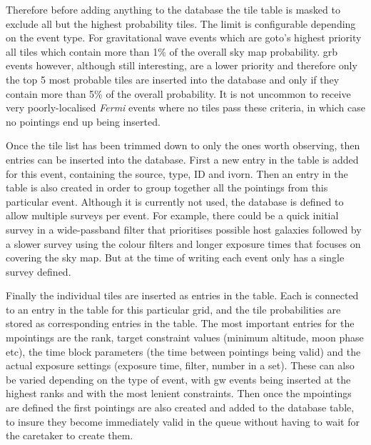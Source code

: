 \begin{colsection}
\begin{colsection}
\newpage











Therefore before adding anything to the database the tile table is masked to exclude all but the highest probability tiles. The limit is configurable depending on the event type. For gravitational wave events which are \gls{goto}'s highest priority all tiles which contain more than 1\% of the overall sky map probability. \gls{grb} events however, although still interesting, are a lower priority and therefore only the top 5 most probable tiles are inserted into the database and only if they contain more than 5\% of the overall probability. It is not uncommon to receive very poorly-localised \textit{Fermi} events where no tiles pass these criteria, in which case no pointings end up being inserted.

Once the tile list has been trimmed down to only the ones worth observing, then entries can be inserted into the database. First a new entry in the  table is added for this event, containing the source, type, ID and \gls{ivorn}. Then an entry in the  table is also created in order to group together all the pointings from this particular event. Although it is currently not used, the database is defined to allow multiple surveys per event. For example, there could be a quick initial survey in a wide-passband filter that prioritises possible host galaxies followed by a slower survey using the colour filters and longer exposure times that focuses on covering the sky map. But at the time of writing each event only has a single survey defined.

Finally the individual tiles are inserted as entries in the  table. Each is connected to an entry in the  table for this particular grid, and the tile probabilities are stored as corresponding entries in the  table. The most important entries for the mpointings are the rank, target constraint values (minimum altitude, moon phase etc), the time block parameters (the time between pointings being valid) and the actual exposure settings (exposure time, filter, number in a set). These can also be varied depending on the type of event, with \gls{gw} events being inserted at the highest ranks and with the most lenient constraints. Then once the mpointings are defined the first pointings are also created and added to the database  table, to insure they become immediately valid in the queue without having to wait for the caretaker to create them.


\end{colsection}
\end{colsection}
